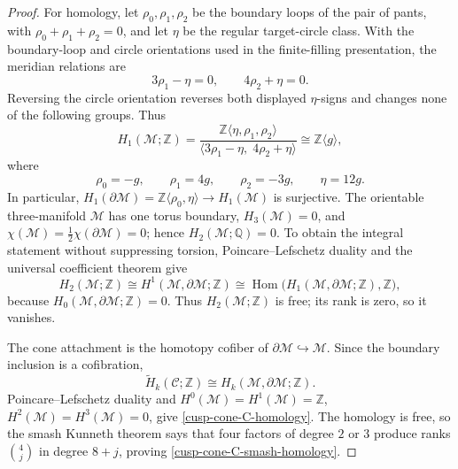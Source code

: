 \begin{proof}
For homology, let \(\rho_0,\rho_1,\rho_2\) be the boundary loops of the pair
of pants, with \(\rho_0+\rho_1+\rho_2=0\), and let \(\eta\) be the regular
target-circle class.  With the boundary-loop and circle orientations used
in the finite-filling presentation, the meridian relations are
\begin{equation}
 3\rho_1-\eta=0,\qquad4\rho_2+\eta=0.
 \label{cusp-cone-Seifert-meridians}
\end{equation}
Reversing the circle orientation reverses both displayed \(\eta\)-signs
and changes none of the following groups.  Thus
\begin{equation}
 H_1(\mathcal M;\mathbb Z)
 =\frac{\mathbb Z\langle\eta,\rho_1,\rho_2\rangle}
 {\langle3\rho_1-\eta,\;4\rho_2+\eta\rangle}
 \cong\mathbb Z\langle g\rangle,
 \label{cusp-cone-M-H1}
\end{equation}
where
\begin{equation}
 \rho_0=-g,\qquad\rho_1=4g,\qquad
 \rho_2=-3g,\qquad\eta=12g.
 \label{cusp-cone-M-boundary-map}
\end{equation}
In particular,
\(H_1(\partial\mathcal M)=\mathbb Z\langle\rho_0,\eta\rangle
\to H_1(\mathcal M)\) is surjective.  The orientable three-manifold
\(\mathcal M\) has one torus boundary, \(H_3(\mathcal M)=0\), and
\(\chi(\mathcal M)=\frac12\chi(\partial\mathcal M)=0\); hence
\(H_2(\mathcal M;\mathbb Q)=0\).  To obtain the integral statement without
suppressing torsion, Poincare--Lefschetz duality and the universal
coefficient theorem give
\[
 H_2(\mathcal M;\mathbb Z)
 \cong H^1(\mathcal M,\partial\mathcal M;\mathbb Z)
 \cong \operatorname{Hom}
 \bigl(H_1(\mathcal M,\partial\mathcal M;\mathbb Z),\mathbb Z\bigr),
\]
because \(H_0(\mathcal M,\partial\mathcal M;\mathbb Z)=0\).  Thus
\(H_2(\mathcal M;\mathbb Z)\) is free; its rank is zero, so it vanishes.

The cone attachment is the homotopy cofiber of
\(\partial\mathcal M\hookrightarrow\mathcal M\).  Since the boundary
inclusion is a cofibration,
\[
 \widetilde H_k(\mathcal C;\mathbb Z)
 \cong H_k(\mathcal M,\partial\mathcal M;\mathbb Z).
\]
Poincare--Lefschetz duality and
\(H^0(\mathcal M)=H^1(\mathcal M)=\mathbb Z\),
\(H^2(\mathcal M)=H^3(\mathcal M)=0\), give
\cref{cusp-cone-C-homology}.  The homology is free, so the smash Kunneth
theorem says that four factors of degree \(2\) or \(3\) produce ranks
\(\binom4j\) in degree \(8+j\), proving
\cref{cusp-cone-C-smash-homology}.
\end{proof}

